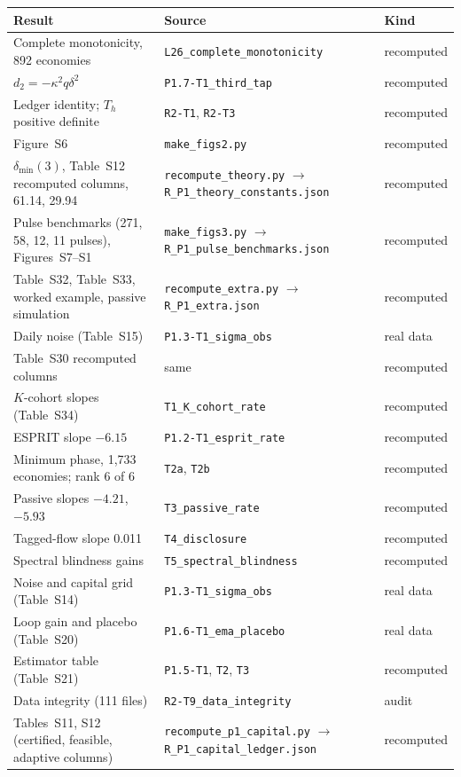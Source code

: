 \documentclass[12pt]{article}
\theoremstyle{definition}
\theoremstyle{remark}
\begin{document}
\begin{longtable}{p{}p{}p{}}
\toprule
Result & Source & Kind\\
\midrule
\endhead
Complete monotonicity, 892 economies & \texttt{L26\_complete\_monotonicity} & recomputed\\
$d_2=-\kappa^2q\delta^2$ & \texttt{P1.7-T1\_third\_tap} & recomputed\\
Ledger identity; $T_h$ positive definite & \texttt{R2-T1}, \texttt{R2-T3} & recomputed\\
Figure~S6 & \texttt{make\_figs2.py} & recomputed\\
$\delta_{\min}(3)$, Table~S12 recomputed columns, 61.14, 29.94 & \texttt{recompute\_theory.py} $\to$ \texttt{R\_P1\_theory\_constants.json} & recomputed\\
Pulse benchmarks (271, 58, 12, 11 pulses), Figures~S7--S1 & \texttt{make\_figs3.py} $\to$ \texttt{R\_P1\_pulse\_benchmarks.json} & recomputed\\
Table~S32, Table~S33, worked example, passive simulation & \texttt{recompute\_extra.py} $\to$ \texttt{R\_P1\_extra.json} & recomputed\\
Daily noise (Table~S15) & \texttt{P1.3-T1\_sigma\_obs} & real data\\
Table~S30 recomputed columns & same & recomputed\\
$K$-cohort slopes (Table~S34) & \texttt{T1\_K\_cohort\_rate} & recomputed\\
ESPRIT slope $-6.15$ & \texttt{P1.2-T1\_esprit\_rate} & recomputed\\
Minimum phase, 1,733 economies; rank 6 of 6 & \texttt{T2a}, \texttt{T2b} & recomputed\\
Passive slopes $-4.21$, $-5.93$ & \texttt{T3\_passive\_rate} & recomputed\\
Tagged-flow slope 0.011 & \texttt{T4\_disclosure} & recomputed\\
Spectral blindness gains & \texttt{T5\_spectral\_blindness} & recomputed\\
Noise and capital grid (Table~S14) & \texttt{P1.3-T1\_sigma\_obs} & real data\\
Loop gain and placebo (Table~S20) & \texttt{P1.6-T1\_ema\_placebo} & real data\\
Estimator table (Table~S21) & \texttt{P1.5-T1}, \texttt{T2}, \texttt{T3} & recomputed\\
Data integrity (111 files) & \texttt{R2-T9\_data\_integrity} & audit\\
Tables~S11, S12 (certified, feasible, adaptive columns) & \texttt{recompute\_p1\_capital.py} $\to$ \texttt{R\_P1\_capital\_ledger.json} & recomputed\\

\end{longtable}
\end{document}
